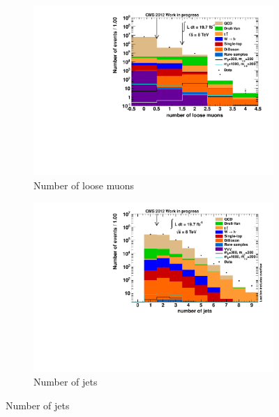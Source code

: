 \begin{figure}[!htbp]
  \centering
  \begin{subfigure}[b]{0.495\textwidth}
    \centering
    \includegraphics[width=\textwidth]{plots/nTL_nloose.pdf}
    \caption{Number of loose muons\label{fig:ntlnloose}}
  \end{subfigure}
  \begin{subfigure}[b]{0.495\textwidth}
    \centering
    \includegraphics[width=\textwidth]{plots/nTL_njets.pdf}
    \caption{Number of jets\label{fig:ntlnjets}}
  \end{subfigure}
\end{figure}

